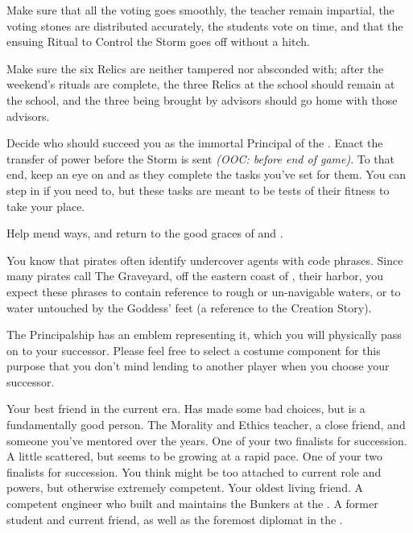 \documentclass[char]{GL2020}
\begin{document}
\begin{itemz}
	\item Make sure that all the voting goes smoothly, the teacher remain impartial, the voting stones are distributed accurately, the students vote on time, and that the ensuing Ritual to Control the Storm goes off without a hitch.
	\item Make sure the six Relics are neither tampered nor absconded with; after the weekend's rituals are complete, the three Relics at the school should remain at the school, and the three being brought by advisors should go home with those advisors.
	\item Decide who should succeed you as the immortal Principal of the \pSchool{}. Enact the transfer of power before the Storm is sent \emph{(OOC: before end of game)}. To that end, keep an eye on \cMusic{} and \cBeetle{} as they complete the tasks you've set for them. You can step in if you need to, but these tasks are meant to be tests of their fitness to take your place.
	\item Help \cChupAvenger{} mend \cChupAvenger{\their} ways, and return to the good graces of \cEbb{} and \cFlow{}.
\end{itemz}

\begin{itemz}[Notes]
	\item You know that pirates often identify undercover agents with code phrases. Since many pirates call The Graveyard, off the eastern coast of \pEarth{}, their harbor, you expect these phrases to contain reference to rough or un-navigable waters, or to water untouched by the Goddess' feet (a reference to the \pShippie{} Creation Story).
	\item The Principalship has an emblem representing it, which you will physically pass on to your successor. Please feel free to select a costume component for this purpose that you don't mind lending to another player when you choose your successor.

\end{itemz}

\begin{contacts}
	\contact{\cChupAvenger{}} Your best friend in the current era. Has made some bad choices, but is a fundamentally good person.
	\contact{\cEthics{}} The Morality and Ethics teacher, a close friend, and someone you've mentored over the years.
	\contact{\cMusic{}} One of your two finalists for succession. A little scattered, but seems to be growing at a rapid pace.
	\contact{\cBeetle{}} One of your two finalists for succession. You think \cBeetle{\they} might be too attached to \cBeetle{\their} current role and powers, but \cBeetle{\theyare} otherwise extremely competent.
	\contact{\cBunker{}} Your oldest living friend. A competent engineer who built and maintains the Bunkers at the \pSc{}.
	\contact{\cDiplomat{}} A former student and current friend, as well as the foremost diplomat in the \pTech{}.
\end{contacts}
\end{document}
